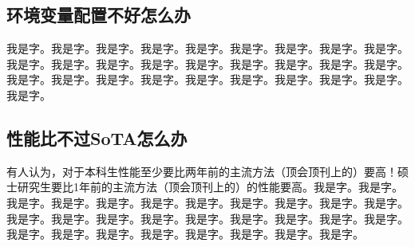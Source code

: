 \documentclass[supercite]{HustGraduPaper}
\theoremstyle{definition}
\begin{document}

\subsection{环境变量配置不好怎么办}


我是字。我是字。我是字。我是字。我是字。我是字。我是字。我是字。我是字。我是字。我是字。我是字。我是字。我是字。我是字。我是字。我是字。我是字。我是字。我是字。我是字。我是字。我是字。我是字。我是字。我是字。我是字。我是字。

\subsection{性能比不过SoTA怎么办}


有人认为，对于本科生性能至少要比两年前的主流方法（顶会顶刊上的）要高\cite{STR2021Neurocom}！硕士研究生要比1年前的主流方法（顶会顶刊上的）的性能要高。我是字。我是字。我是字。我是字。我是字。我是字。我是字。我是字。我是字。我是字。我是字。我是字。我是字。我是字。我是字。我是字。我是字。我是字。我是字。我是字。我是字。我是字。我是字。我是字。我是字。我是字。我是字。我是字。
\end{document}
